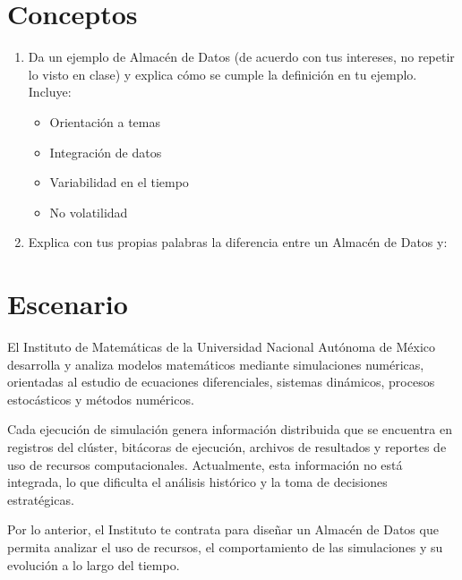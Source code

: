 \section{Conceptos}

    \begin{enumerate}

        \item Da un ejemplo de Almacén de Datos (de acuerdo con tus intereses, no repetir lo visto en clase) y explica cómo se cumple la definición en tu ejemplo. Incluye:

            \begin{itemize}
                \item Orientación a temas
                \item Integración de datos
                \item Variabilidad en el tiempo
                \item No volatilidad
            \end{itemize}

            

        \item Explica con tus propias palabras la diferencia entre un Almacén de Datos y:
            

    \end{enumerate}


\section{Escenario}

    \begin{tcolorbox}[title=Contexto]
        El Instituto de Matemáticas de la Universidad Nacional Autónoma de México desarrolla
        y analiza modelos matemáticos mediante simulaciones numéricas, orientadas al estudio de
        ecuaciones diferenciales, sistemas dinámicos, procesos estocásticos y métodos numéricos.

        Cada ejecución de simulación genera información distribuida que se encuentra en registros del clúster, bitácoras de ejecución, archivos de resultados y reportes de uso de recursos computacionales. Actualmente, esta información no está integrada, lo que dificulta el análisis histórico y la toma de decisiones estratégicas.

        Por lo anterior, el Instituto te contrata para diseñar un Almacén de Datos que permita
        analizar el uso de recursos, el comportamiento de las simulaciones y su evolución a lo largo del tiempo.
    \end{tcolorbox}


